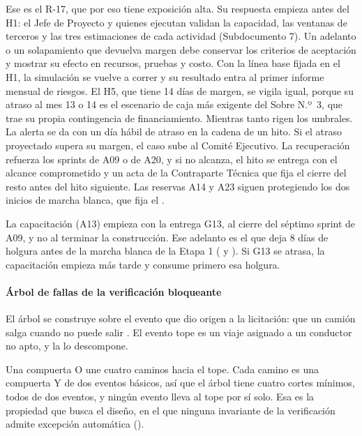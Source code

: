 Ese es el R-17, que por eso tiene exposición alta. Su respuesta empieza antes del H1: el Jefe de
Proyecto y quienes ejecutan validan la capacidad, las ventanas de terceros y las tres estimaciones de
cada actividad (Subdocumento 7). Un adelanto o un solapamiento que devuelva margen debe conservar los
criterios de aceptación y mostrar su efecto en recursos, pruebas y costo. Con la línea base fijada en el
H1, la simulación se vuelve a correr y su resultado entra al primer informe mensual de riesgos. El H5,
que tiene 14 días de margen, se vigila igual, porque su atraso al mes 13 o 14 es el escenario de caja
más exigente del Sobre N.º~3, que trae su propia contingencia de financiamiento. Mientras tanto rigen los umbrales. La alerta se da
con un día hábil de atraso en la cadena de un hito. Si el atraso proyectado supera su margen, el caso sube
al Comité Ejecutivo. La recuperación refuerza los sprints de A09 o de A20, y si no alcanza, el hito se
entrega con el alcance comprometido y un acta de la Contraparte Técnica que fija el cierre del resto antes
del hito siguiente. Las reservas A14 y A23 siguen protegiendo los dos inicios de marcha blanca, que fija
el .

La capacitación (A13) empieza con la entrega G13, al cierre del séptimo sprint de A09, y no al terminar la
construcción. Ese adelanto es el que deja 8 días de holgura antes de la marcha blanca de la Etapa 1
( y ). Si G13 se atrasa, la
capacitación empieza más tarde y consume primero esa holgura.

\paragraph{Árbol de fallas de la verificación bloqueante}
El árbol se construye sobre el evento que dio origen a la licitación: que un camión salga cuando no puede
salir . El evento tope es un viaje asignado a un conductor no apto, y la
 lo descompone.


Una compuerta O une cuatro caminos hacia el tope. Cada camino es una compuerta Y de dos eventos básicos,
así que el árbol tiene cuatro cortes mínimos, todos de dos eventos, y ningún evento lleva al tope por sí
solo. Esa es la propiedad que busca el diseño, en el que ninguna invariante de la verificación admite
excepción automática ().

